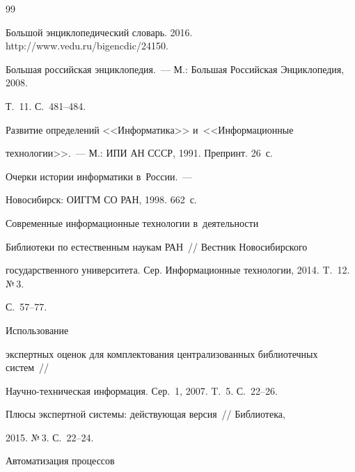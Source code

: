{\small\frenchspacing


{%




\begin{thebibliography}{99}




Большой энциклопедический словарь. 2016. {\sf http://www.vedu.ru/bigencdic/24150}.




Большая российская энциклопедия.~--- М.: Большая Российская Энциклопедия, 2008. 


Т.~11. С.~481--484.






Развитие определений <<Информатика>> и~<<Информационные 


технологии>>.~--- М.: ИПИ АН СССР, 1991.  Препринт. 26~с.




 Очерки истории информатики в~России.~--- 


Новосибирск: ОИГГМ СО РАН, 1998. 662~с.




 Современные информационные технологии в~деятельности 


Библиотеки по естественным наукам РАН~/\!\!/ Вестник Новосибирского 


государственного университета. Сер. Информационные технологии, 2014. T.~12. №\,3. 


С.~57--77.




 Использование 


экспертных оценок для комплектования централизованных библиотечных систем~/\!\!/ 


На\-уч\-но-тех\-ни\-че\-ская информация. Сер.~1, 2007. T.~5. С.~22--26.




 Плюсы экспертной системы: действующая версия~/\!\!/ Библиотека, 


2015. №\,3. С.~22--24.




 Автоматизация процессов 



\end{thebibliography}}}
